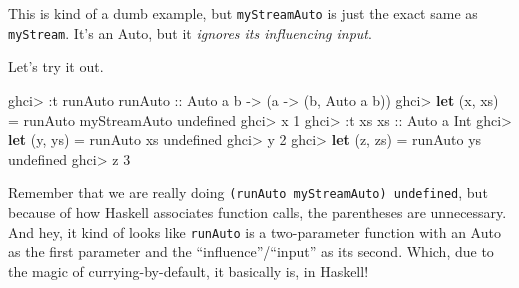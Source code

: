 \documentclass[]{article}
\newenvironment{Shaded}{\begin{snugshade}}{\end{snugshade}}
\newcommand{\CommentTok}[1]{\textcolor[rgb]{0.56,0.35,0.01}{\textit{#1}}}
\newcommand{\DataTypeTok}[1]{\textcolor[rgb]{0.13,0.29,0.53}{#1}}
\newcommand{\DecValTok}[1]{\textcolor[rgb]{0.00,0.00,0.81}{#1}}
\newcommand{\FunctionTok}[1]{\textcolor[rgb]{0.00,0.00,0.00}{#1}}
\newcommand{\KeywordTok}[1]{\textcolor[rgb]{0.13,0.29,0.53}{\textbf{#1}}}
\newcommand{\NormalTok}[1]{#1}
\newcommand{\OtherTok}[1]{\textcolor[rgb]{0.56,0.35,0.01}{#1}}
\begin{document}
\begin{Shaded}
\end{Shaded}

This is kind of a dumb example, but \texttt{myStreamAuto} is just the exact same
as \texttt{myStream}. It's an Auto, but it \emph{ignores its influencing input}.

Let's try it out.

\begin{Shaded}
\begin{Highlighting}[]
\NormalTok{ghci}\FunctionTok{>} \FunctionTok{:}\NormalTok{t runAuto}
\OtherTok{runAuto ::} \DataTypeTok{Auto}\NormalTok{ a b }\OtherTok{->}\NormalTok{ (a }\OtherTok{->}\NormalTok{ (b, }\DataTypeTok{Auto}\NormalTok{ a b))}
\NormalTok{ghci}\FunctionTok{>} \KeywordTok{let}\NormalTok{ (x, xs) }\FunctionTok{=}\NormalTok{ runAuto myStreamAuto undefined}
\NormalTok{ghci}\FunctionTok{>}\NormalTok{ x}
\DecValTok{1}
\NormalTok{ghci}\FunctionTok{>} \FunctionTok{:}\NormalTok{t xs}
\OtherTok{xs ::} \DataTypeTok{Auto}\NormalTok{ a }\DataTypeTok{Int}
\NormalTok{ghci}\FunctionTok{>} \KeywordTok{let}\NormalTok{ (y, ys) }\FunctionTok{=}\NormalTok{ runAuto xs undefined}
\NormalTok{ghci}\FunctionTok{>}\NormalTok{ y}
\DecValTok{2}
\NormalTok{ghci}\FunctionTok{>} \KeywordTok{let}\NormalTok{ (z, zs) }\FunctionTok{=}\NormalTok{ runAuto ys undefined}
\NormalTok{ghci}\FunctionTok{>}\NormalTok{ z}
\DecValTok{3}
\end{Highlighting}
\end{Shaded}

Remember that we are really doing \texttt{(runAuto\ myStreamAuto)\ undefined},
but because of how Haskell associates function calls, the parentheses are
unnecessary. And hey, it kind of looks like \texttt{runAuto} is a two-parameter
function with an Auto as the first parameter and the ``influence''/``input'' as
its second. Which, due to the magic of currying-by-default, it basically is, in
Haskell!
\end{document}
